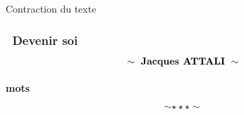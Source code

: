 \newpage \begin{bclogo}[barre=none,logo={}]{Contraction du texte} 
	\begin{center}
		\subsubsection*{\guillemetleft\ Devenir soi \guillemetright\ $$\sim\ \text{{\bfseries Jacques ATTALI}}\ \sim$$}
	\end{center}
\end{bclogo}
	\hspace*{0.5cm}
	
\begin{center}
	{\textbf{ mots}}
\end{center}
$$\sim\star\star\star\sim$$

